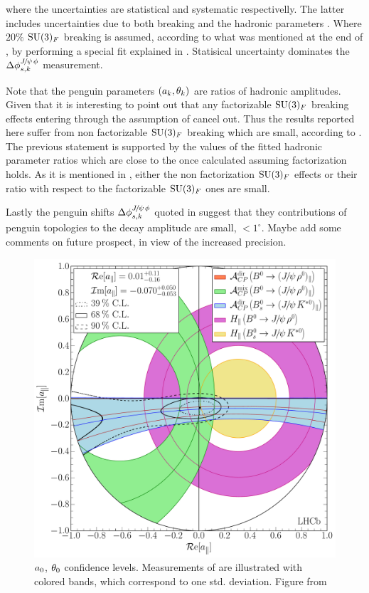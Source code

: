 \noindent where the uncertainties are statistical and systematic respectivelly. The latter includes 
uncertainties due to both \grpsuthree breaking and the hadronic parameters . 
Where  $20\%$ $\mathrm{SU}(3)_F$ breaking is assumed, according to what was mentioned at the end of 
, by performing a special fit explained in . 
Statisical uncertainty dominates the $\Delta\phi^{{J\mskip -3mu/\mskip -2mu\psi\mskip 2mu}\phi}_{s,{k}}$ measurement.

Note that the penguin parameters $(a_k,\theta_k)$ are ratios of hadronic amplitudes. Given that it is
interesting to point out that any factorizable $\mathrm{SU}(3)_F$ breaking effects entering through the assumption
of  cancel out.
Thus the results reported here suffer from non factorizable $\mathrm{SU}(3)_F$ breaking which are small,
according to \cite{DeBruyn-thesis}. The previous statement is supported by the values of the fitted hadronic parameter
ratios which are close to the once calculated assuming factorization holds. As it is mentioned in \cite{DeBruyn-thesis},
either the non factorization $\mathrm{SU}(3)_F$ effects or their ratio with respect to the factorizable $\mathrm{SU}(3)_F$
ones are small.

Lastly the penguin shifts $\Delta\phi^{{J\mskip -3mu/\mskip -2mu\psi\mskip 2mu}\phi}_{s,{k}}$ quoted in 
suggest that they contributions of penguin topologies to the \BsJpsiPhi decay amplitude are small, $<1^\circ$.
{\color{red} Maybe add some comments on future prospect, in view of the increased precision.}

\begin{figure}[!h]
\centering
  \includegraphics[trim=0.0cm 0.0cm 0.0cm 0.0cm, clip=true,scale=0.4]{Figures/Chapter5/Penguin_Contribution_Re_vs_Im_allB2VV_Para_withH.pdf}
  \caption{$a_{0}$, $\theta_{0}$ confidence levels. Measurements of  are illustrated with 
           colored bands, which correspond to one std. deviation. Figure from \cite{DeBruyn-thesis}}
  \label{pengPlot_para}
\end{figure}


